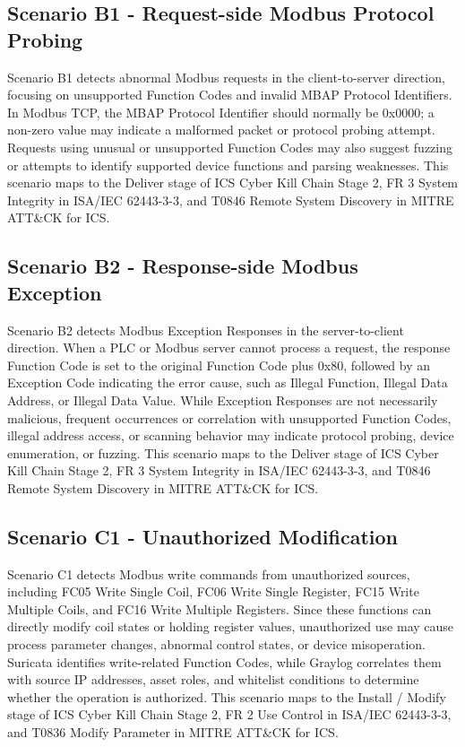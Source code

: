 \subsection{Scenario B1 - Request-side Modbus Protocol Probing}Scenario B1 detects abnormal Modbus requests in the client-to-server direction, focusing on unsupported Function Codes and invalid MBAP Protocol Identifiers. In Modbus TCP, the MBAP Protocol Identifier should normally be 0x0000; a non-zero value may indicate a malformed packet or protocol probing attempt. Requests using unusual or unsupported Function Codes may also suggest fuzzing or attempts to identify supported device functions and parsing weaknesses. This scenario maps to the Deliver stage of ICS Cyber Kill Chain Stage 2, FR 3 System Integrity in ISA/IEC 62443-3-3, and T0846 Remote System Discovery in MITRE ATT\&CK for ICS.

\subsection{Scenario B2 - Response-side Modbus Exception }Scenario B2 detects Modbus Exception Responses in the server-to-client direction. When a PLC or Modbus server cannot process a request, the response Function Code is set to the original Function Code plus 0x80, followed by an Exception Code indicating the error cause, such as Illegal Function, Illegal Data Address, or Illegal Data Value. While Exception Responses are not necessarily malicious, frequent occurrences or correlation with unsupported Function Codes, illegal address access, or scanning behavior may indicate protocol probing, device enumeration, or fuzzing. This scenario maps to the Deliver stage of ICS Cyber Kill Chain Stage 2, FR 3 System Integrity in ISA/IEC 62443-3-3, and T0846 Remote System Discovery in MITRE ATT\&CK for ICS.

\subsection{Scenario C1 - Unauthorized Modification}Scenario C1 detects Modbus write commands from unauthorized sources, including FC05 Write Single Coil, FC06 Write Single Register, FC15 Write Multiple Coils, and FC16 Write Multiple Registers. Since these functions can directly modify coil states or holding register values, unauthorized use may cause process parameter changes, abnormal control states, or device misoperation. Suricata identifies write-related Function Codes, while Graylog correlates them with source IP addresses, asset roles, and whitelist conditions to determine whether the operation is authorized. This scenario maps to the Install / Modify stage of ICS Cyber Kill Chain Stage 2, FR 2 Use Control in ISA/IEC 62443-3-3, and T0836 Modify Parameter in MITRE ATT\&CK for ICS.

